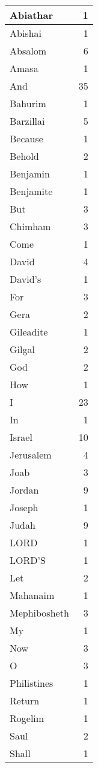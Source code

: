 \begin{center}
\begin{longtable}{l|r}
\hline \hline
\endlastfoot
Abiathar & 1 \\ \hline
Abishai & 1 \\ \hline
Absalom & 6 \\ \hline
Amasa & 1 \\ \hline
And & 35 \\ \hline
Bahurim & 1 \\ \hline
Barzillai & 5 \\ \hline
Because & 1 \\ \hline
Behold & 2 \\ \hline
Benjamin & 1 \\ \hline
Benjamite & 1 \\ \hline
But & 3 \\ \hline
Chimham & 3 \\ \hline
Come & 1 \\ \hline
David & 4 \\ \hline
David's & 1 \\ \hline
For & 3 \\ \hline
Gera & 2 \\ \hline
Gileadite & 1 \\ \hline
Gilgal & 2 \\ \hline
God & 2 \\ \hline
How & 1 \\ \hline
I & 23 \\ \hline
In & 1 \\ \hline
Israel & 10 \\ \hline
Jerusalem & 4 \\ \hline
Joab & 3 \\ \hline
Jordan & 9 \\ \hline
Joseph & 1 \\ \hline
Judah & 9 \\ \hline
LORD & 1 \\ \hline
LORD'S & 1 \\ \hline
Let & 2 \\ \hline
Mahanaim & 1 \\ \hline
Mephibosheth & 3 \\ \hline
My & 1 \\ \hline
Now & 3 \\ \hline
O & 3 \\ \hline
Philistines & 1 \\ \hline
Return & 1 \\ \hline
Rogelim & 1 \\ \hline
Saul & 2 \\ \hline
Shall & 1 \\ \hline

\end{longtable}
\end{center}
